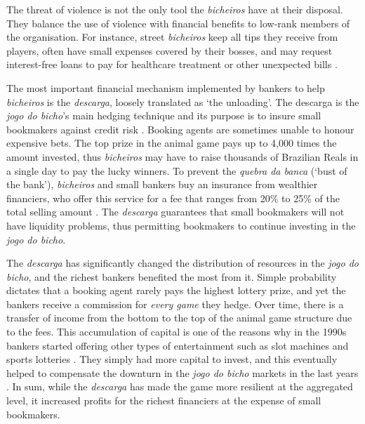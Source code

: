 \documentclass[a4paper,12pt]{article}
\begin{document}
The threat of violence is not the only tool the \textit{bicheiros} have at their disposal. They balance the use of violence with financial benefits to low-rank members of the organisation. For instance, street \textit{bicheiros} keep all tips they receive from players, often have small expenses covered by their bosses, and may request interest-free loans to pay for healthcare treatment or other unexpected bills \citep{labronici2012paratodos}.

The most important financial mechanism implemented by bankers to help \textit{bicheiros} is the \textit{descarga}, loosely translated as `the unloading'. The descarga is the \textit{jogo do bicho}'s main hedging technique and its purpose is to insure small bookmakers against credit risk \citetext{\citealp[59]{labronici2012paratodos}; \citealp[178]{magalhaes2005ganhou}}. Booking agents are sometimes unable to honour expensive bets. The top prize in the animal game pays up to 4,000 times the amount invested, thus \textit{bicheiros} may have to raise thousands of Brazilian Reals in a single day to pay the lucky winners. To prevent the \textit{quebra da banca} (`bust of the bank'), \textit{bicheiros} and small bankers buy an insurance from wealthier financiers, who offer this service for a fee that ranges from 20\% to 25\% of the total selling amount \citep{fsp2006descarga}. The \textit{descarga} guarantees that small bookmakers will not have liquidity problems, thus permitting bookmakers to continue investing in the \textit{jogo do bicho}.

The \textit{descarga} has significantly changed the distribution of resources in the \textit{jogo do bicho}, and the richest bankers benefited the most from it. Simple probability dictates that a booking agent rarely pays the highest lottery prize, and yet the bankers receive a commission for \textit{every game} they hedge. Over time, there is a transfer of income from the bottom to the top of the animal game structure due to the fees. This accumulation of capital is one of the reasons why in the 1990s bankers started offering other types of entertainment such as slot machines and sports lotteries \citep{estado2006cacaniquel,globo2015cacaniquel,terra2011cacaniquel}. They simply had more capital to invest, and this eventually helped to compensate the downturn in the \textit{jogo do bicho} markets in the last years \citep{globo2017castor}. In sum, while the \textit{descarga} has made the game more resilient at the aggregated level, it increased profits for the richest financiers at the expense of small bookmakers.
\end{document}
